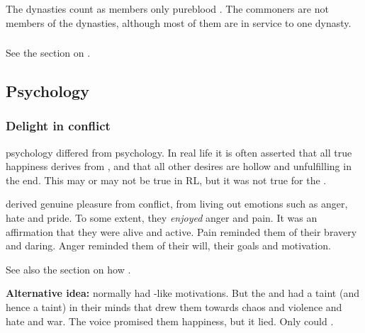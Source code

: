 The dynasties count as members only pureblood \resphain{}. 
The \ashenblooded{} commoners are not members of the dynasties, although most of them are in service to one dynasty. 





\subsubsection{\Noggyaleth}
See the section on . 









\subsection{Psychology}





\subsubsection{Delight in conflict}
\Resphan psychology differed from \human psychology.
In real life it is often asserted that all true happiness derives from , and that all other desires are hollow and unfulfilling in the end.
This may or may not be true in RL, but it was not true for the \resphain.

\Resphain derived genuine pleasure from conflict, from living out  emotions such as anger, hate and pride.
To some extent, they \emph{enjoyed} anger and pain.
It was an affirmation that they were alive and active.
Pain reminded them of their bravery and daring.
Anger reminded them of their will, their goals and motivation.

See also the section on how .

\textbf{Alternative idea:} 
\Resphain normally had \human-like motivations.
But the \satharioth and \ketherain had a \draconian taint (and hence a \xs taint) in their minds that drew them towards chaos and violence and hate and war. 
The voice promised them happiness, but it lied.
Only \dragons could . 






